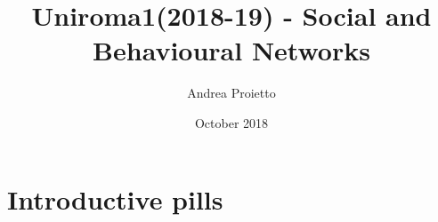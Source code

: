 \documentclass{report}
\title{Uniroma1(2018-19) - Social and Behavioural Networks}
\author{Andrea Proietto}
\date{October 2018}
\begin{document}
\maketitle










\chapter{Introductive pills}
	
	
	
	
	
	\
	
\end{document}
